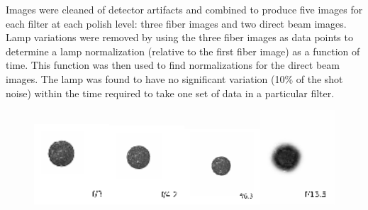Images were cleaned of detector artifacts and combined to produce five
images for each filter at each polish level: three fiber images and
two direct beam images. Lamp variations were removed by using the
three fiber images as data points to determine a lamp normalization
(relative to the first fiber image) as a function of time. This
function was then used to find normalizations for the direct beam
images. The lamp was found to have no significant variation (10\% of the shot noise)
 within the time required to take one set of data in a particular filter.

\begin{figure}[ht]
\centering
\includegraphics[width=0.25\textwidth]{FRD/figs/bdirect_3.eps}\includegraphics[width=0.25\textwidth]{FRD/figs/bdirect_42.eps}\includegraphics[width=0.25\textwidth]{FRD/figs/bdirect_63.eps}\includegraphics[width=0.25\textwidth]{FRD/figs/bdirect_135.eps}\\

\end{figure}
